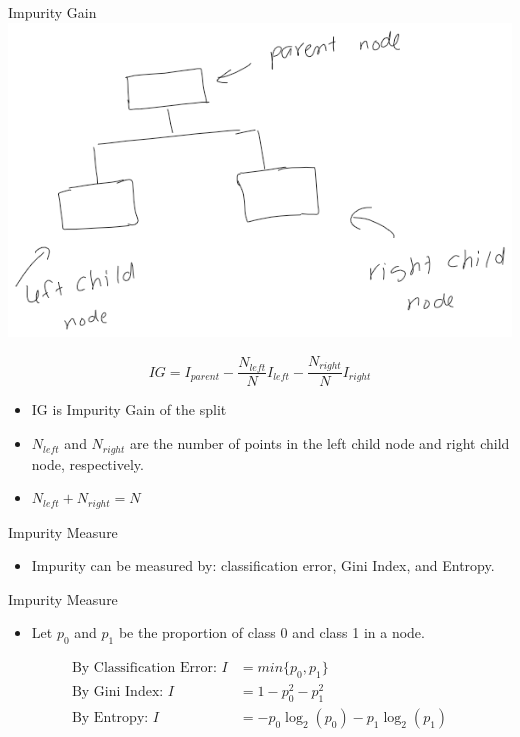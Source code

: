 \documentclass[
  ignorenonframetext,
]{beamer}
\providecommand{\tightlist}{%
  \setlength{\itemsep}{0pt}\setlength{\parskip}{0pt}}\usepackage{longtable,booktabs,array}
\begin{document}
\begin{frame}{Impurity Gain}
\label{impurity-gain}
\includegraphics{images/parent_child.png}

\[
IG = I_{parent} - \frac{N_{left}}{N}I_{left}-\frac{N_{right}}{N}I_{right}
\]

\begin{itemize}
\tightlist
\item
  IG is Impurity Gain of the split
\item
  \(N_{left}\) and \(N_{right}\) are the number of points in the left
  child node and right child node, respectively.
\item
  \(N_{left}+N_{right}=N\)
\end{itemize}
\end{frame}

\begin{frame}{Impurity Measure}
\label{impurity-measure-2}
\begin{itemize}
\tightlist
\item
  Impurity can be measured by: classification error, Gini Index, and
  Entropy.
\end{itemize}
\end{frame}

\begin{frame}{Impurity Measure}
\label{impurity-measure-3}
\begin{itemize}
\tightlist
\item
  Let \(p_0\) and \(p_1\) be the proportion of class 0 and class 1 in a
  node.
\end{itemize}

\begin{align*}
{\text{By Classification Error: }} I &= min\{p_0, p_1\} \\
{\text{By Gini Index: }} I&= 1 - p_0^2-p_1^2 \\
{\text{By Entropy: }} I &= -p_0 \log_2(p_0)-p_1\log_2(p_1) 
\end{align*}
\end{frame}
\end{document}
